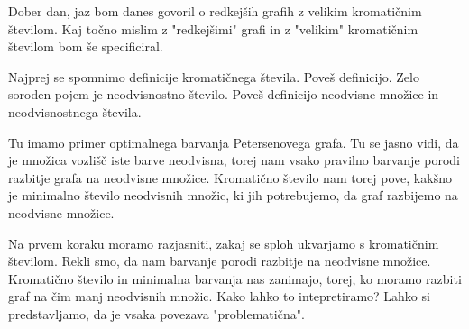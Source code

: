 \documentclass[t]{article} %
\begin{document}
Dober dan, jaz bom danes govoril o redkejših grafih z velikim kromatičnim številom. Kaj točno mislim z "redkejšimi" grafi in z "velikim"
kromatičnim številom bom še specificiral.

Najprej se spomnimo definicije kromatičnega števila. Poveš definicijo. Zelo soroden pojem je neodvisnostno število. Poveš definicijo neodvisne
množice in neodvisnostnega števila.

Tu imamo primer optimalnega barvanja Petersenovega grafa. Tu se jasno vidi, da je množica vozlišč iste barve neodvisna, torej nam vsako pravilno barvanje
porodi razbitje grafa na neodvisne množice. Kromatično število nam torej pove, kakšno je minimalno število neodvisnih množic, ki jih potrebujemo,
da graf razbijemo na neodvisne množice.

Na prvem koraku moramo razjasniti, zakaj se sploh ukvarjamo s kromatičnim številom. Rekli smo, da nam barvanje porodi razbitje na neodvisne množice.
Kromatično število in minimalna barvanja nas zanimajo, torej, ko moramo razbiti graf na čim manj neodvisnih množic. Kako lahko to intepretiramo? Lahko si
predstavljamo, da je vsaka povezava "problematična". 
\end{document}
